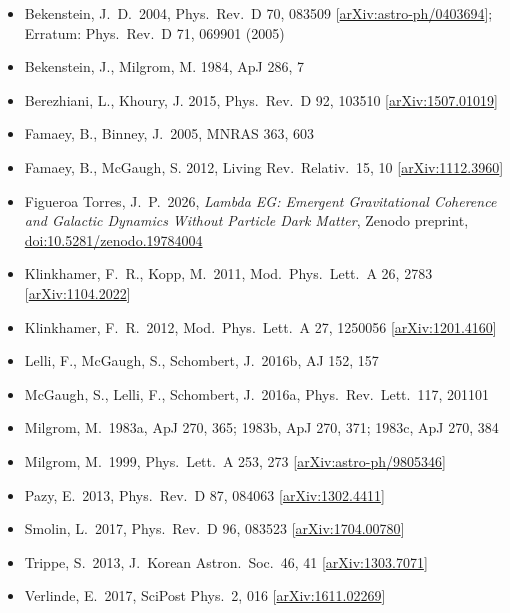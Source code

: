 \documentclass[11pt]{article}
\theoremstyle{plain}
\begin{document}
\begin{itemize}[leftmargin=1.6em,itemsep=2pt]
\item Bekenstein, J.\ D.\ 2004, Phys.\ Rev.\ D 70, 083509 [\href{https://arxiv.org/abs/astro-ph/0403694}{arXiv:astro-ph/0403694}]; Erratum: Phys.\ Rev.\ D 71, 069901 (2005)
\item Bekenstein, J., Milgrom, M. 1984, ApJ 286, 7
\item Berezhiani, L., Khoury, J. 2015, Phys.\ Rev.\ D 92, 103510 [\href{https://arxiv.org/abs/1507.01019}{arXiv:1507.01019}]
\item Famaey, B., Binney, J.\ 2005, MNRAS 363, 603
\item Famaey, B., McGaugh, S. 2012, Living Rev.\ Relativ.\ 15, 10 [\href{https://arxiv.org/abs/1112.3960}{arXiv:1112.3960}]
\item Figueroa Torres, J.\ P.\ 2026, \emph{Lambda EG: Emergent Gravitational Coherence and Galactic Dynamics Without Particle Dark Matter}, Zenodo preprint, \href{https://doi.org/10.5281/zenodo.19784004}{doi:10.5281/zenodo.19784004}
\item Klinkhamer, F.\ R., Kopp, M.\ 2011, Mod.\ Phys.\ Lett.\ A 26, 2783 [\href{https://arxiv.org/abs/1104.2022}{arXiv:1104.2022}]
\item Klinkhamer, F.\ R.\ 2012, Mod.\ Phys.\ Lett.\ A 27, 1250056 [\href{https://arxiv.org/abs/1201.4160}{arXiv:1201.4160}]
\item Lelli, F., McGaugh, S., Schombert, J.\ 2016b, AJ 152, 157
\item McGaugh, S., Lelli, F., Schombert, J.\ 2016a, Phys.\ Rev.\ Lett.\ 117, 201101
\item Milgrom, M.\ 1983a, ApJ 270, 365; 1983b, ApJ 270, 371; 1983c, ApJ 270, 384
\item Milgrom, M.\ 1999, Phys.\ Lett.\ A 253, 273 [\href{https://arxiv.org/abs/astro-ph/9805346}{arXiv:astro-ph/9805346}]
\item Pazy, E.\ 2013, Phys.\ Rev.\ D 87, 084063 [\href{https://arxiv.org/abs/1302.4411}{arXiv:1302.4411}]
\item Smolin, L.\ 2017, Phys.\ Rev.\ D 96, 083523 [\href{https://arxiv.org/abs/1704.00780}{arXiv:1704.00780}]
\item Trippe, S.\ 2013, J.\ Korean Astron.\ Soc.\ 46, 41 [\href{https://arxiv.org/abs/1303.7071}{arXiv:1303.7071}]
\item Verlinde, E.\ 2017, SciPost Phys.\ 2, 016 [\href{https://arxiv.org/abs/1611.02269}{arXiv:1611.02269}]
\end{itemize}
\end{document}
